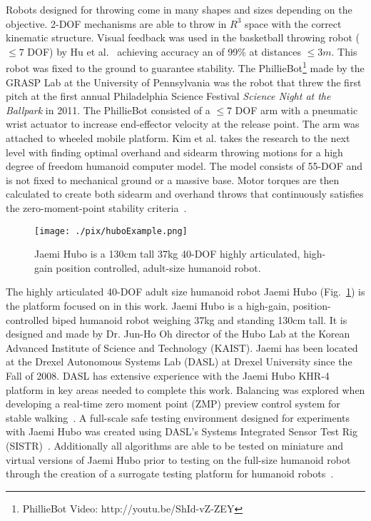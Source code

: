 Robots designed for throwing come in many shapes and sizes depending on the objective.  
2-DOF mechanisms are able to throw in $R^3$ space with the correct kinematic structure.  
Visual feedback was used in the basketball throwing robot ($\leq 7$ DOF) by Hu et al.~\cite{5649335} achieving accuracy an of 99\% at distances $\leq 3m$.  
This robot was fixed to the ground to guarantee stability.
The PhillieBot\footnote{PhillieBot Video: http://youtu.be/ShId-vZ-ZEY} made by the GRASP Lab at the University of Pennsylvania was the robot that threw the first pitch at the first annual Philadelphia Science Festival \textit{Science Night at the Ballpark} in 2011.  
The PhillieBot consisted of a $\leq 7$ DOF arm with a pneumatic wrist actuator to increase end-effector velocity at the release point.  
The arm was attached to wheeled mobile platform.
Kim et al. \cite{5686315,JooH2011438} takes the research to the next level with finding optimal overhand and sidearm throwing motions for a high degree of freedom humanoid computer model.  
The model consists of 55-DOF and is not fixed to mechanical ground or a massive base.  
Motor torques are then calculated to create both sidearm and overhand throws that continuously satisfies the zero-moment-point stability criteria~\cite{4309277}.  

\begin{figure}[t]
  \centering
\texttt{[image: ./pix/huboExample.png]}
  \caption{Jaemi Hubo is a 130cm tall 37kg 40-DOF highly articulated, high-gain position controlled, adult-size humanoid robot.}
  \label{fig:huboFig}
\end{figure}


The highly articulated 40-DOF adult size humanoid robot Jaemi Hubo (Fig.~\ref{fig:huboFig}) is the platform focused on in this work.  Jaemi Hubo is a high-gain, position-controlled biped humanoid robot weighing 37kg and standing 130cm tall.  It is designed and made by Dr. Jun-Ho Oh director of the Hubo Lab at the Korean Advanced Institute of Science and Technology (KAIST).  Jaemi has been located at the Drexel Autonomous Systems Lab (DASL) at Drexel University since the Fall of 2008.  DASL has extensive experience with the Jaemi Hubo KHR-4 platform in key areas needed to complete this work.  Balancing was explored when developing a real-time zero moment point (ZMP) preview control system for stable walking~\cite{5686276}.  A full-scale safe testing environment designed for experiments with Jaemi Hubo was created using DASL's Systems Integrated Sensor Test Rig (SISTR)~\cite{5686325}.  Additionally all algorithms are able to be tested on miniature and virtual versions of Jaemi Hubo prior to testing on the full-size humanoid robot through the creation of a surrogate testing platform for humanoid robots~\cite{5379582}.




